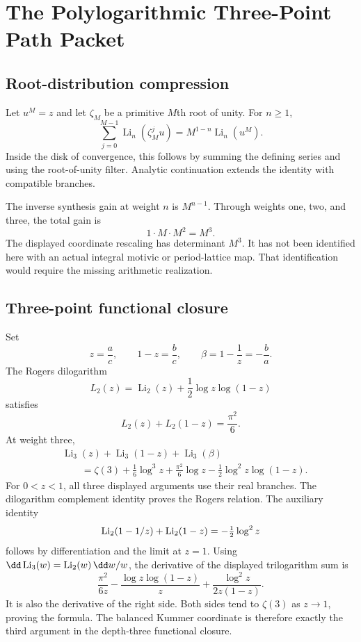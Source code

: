 \clearpage
\section{The Polylogarithmic Three-Point Path Packet}

\subsection{Root-distribution compression}
Let $u^M=z$ and let $\zeta_M$ be a primitive $M$th root of unity. For $n\ge1$,
\[
 \boxed{
 \sum_{j=0}^{M-1}
 \operatorname{Li}_n(\zeta_M^ju)
 =
 M^{1-n}\operatorname{Li}_n(u^M).
 }
\]
Inside the disk of convergence, this follows by summing the defining series and using the root-of-unity filter. Analytic continuation extends the identity with compatible branches.

The inverse synthesis gain at weight $n$ is $M^{n-1}$. Through weights one, two, and three, the total gain is
\[
 \boxed{1\cdot M\cdot M^2=M^3.}
\]
The displayed coordinate rescaling has determinant $M^3$. It has not been identified here with an actual integral motivic or period-lattice map. That identification would require the missing arithmetic realization.

\subsection{Three-point functional closure}
Set
\[
 z=\frac ac,
 \qquad
 1-z=\frac bc,
 \qquad
 \beta=1-\frac1z=-\frac ba.
\]
The Rogers dilogarithm
\[
 L_2(z)
 =
 \operatorname{Li}_2(z)
 +
 \frac12\log z\log(1-z)
\]
satisfies
\[
 \boxed{
 L_2(z)+L_2(1-z)=\frac{\pi^2}{6}.
 }
\]
At weight three,
\[
 \boxed{
 \begin{aligned}
 &\operatorname{Li}_3(z)
 +\operatorname{Li}_3(1-z)
 +\operatorname{Li}_3(\beta)\\
 &\qquad=
 \zeta(3)
 +\frac16\log^3z
 +\frac{\pi^2}{6}\log z
 -\frac12\log^2z\log(1-z).
 \end{aligned}
 }
\]
For $0<z<1$, all three displayed arguments use their real branches. The dilogarithm complement identity proves the Rogers relation. The auxiliary identity
\[
 \operatorname{Li}_2(1-1/z)+\operatorname{Li}_2(1-z)=-\tfrac12\log^2z
\]
follows by differentiation and the limit at $z=1$. Using $\dd\Li_3(w)=\Li_2(w)\,\dd w/w$, the derivative of the displayed trilogarithm sum is
\[
 \frac{\pi^2}{6z}-\frac{\log z\log(1-z)}z+
 \frac{\log^2z}{2z(1-z)}.
\]
It is also the derivative of the right side. Both sides tend to $\zeta(3)$ as $z\to1$, proving the formula. The balanced Kummer coordinate is therefore exactly the third argument in the depth-three functional closure.

